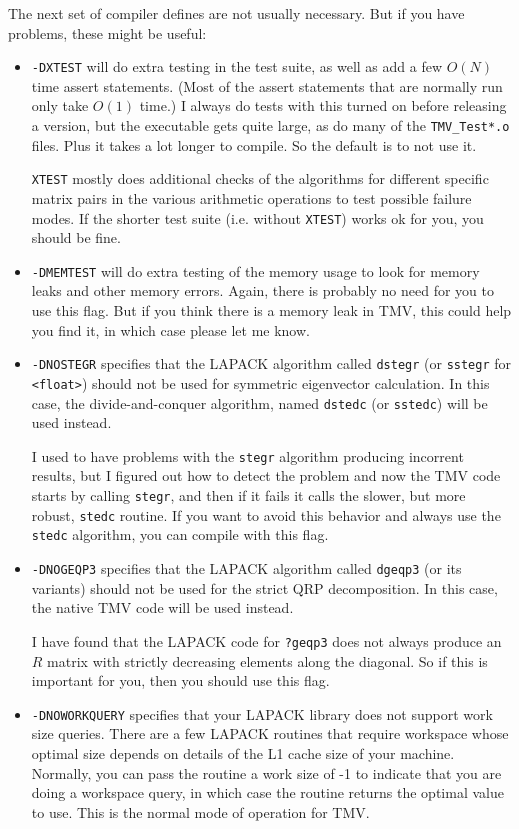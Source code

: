 \documentclass[twoside,letterpaper,11pt]{article}
\renewcommand{\tt}[1]{{\lstinline {#1}}}
\begin{document}
The next set of compiler defines are not usually necessary.  But
if you have problems, these might be useful:
\begin{itemize}
\item
\texttt{-DXTEST} will do extra testing in the test suite, as well as add a few $O(N)$
time assert statements.  (Most of the assert statements that are normally run only take
$O(1)$ time.)  I always do tests with this turned on before releasing a version, but the
executable gets quite large, as do many of the \texttt{TMV\_Test*.o} files.  Plus it takes
a lot longer to compile.  So the default is to not use it.

\texttt{XTEST} mostly does additional checks
of the algorithms for different specific matrix pairs in the various
arithmetic operations to test possible failure modes.  If the shorter test suite
(i.e. without \texttt{XTEST}) works ok for you, you should be fine.

\item
\texttt{-DMEMTEST} will do extra testing of the memory usage to look for memory leaks
and other memory errors.  Again, there is probably no need for you to use this
flag.  But if you think there is a memory leak in TMV, this could help you find it, 
in which case please let me know.

\item
\texttt{-DNOSTEGR} specifies that the LAPACK algorithm called
\tt{dstegr} (or \tt{sstegr} for \tt{<float>}) should not be used for symmetric
eigenvector calculation.  In this case, the divide-and-conquer algorithm,
named \tt{dstedc} (or \tt{sstedc}) will be used instead.

I used to have problems with the \tt{stegr} algorithm producing incorrent
results, but I figured out how to detect the problem and now
the TMV code starts by calling \tt{stegr}, and then if it fails it calls
the slower, but more robust, \tt{stedc} routine.
If you want to avoid this behavior and always use the \tt{stedc} algorithm,
you can compile with this flag.
\item
\texttt{-DNOGEQP3} specifies that the LAPACK algorithm called
\tt{dgeqp3} (or its variants) should not be used for the strict QRP decomposition.
In this case, the native TMV code will be used instead.

I have found that the LAPACK code for \tt{?geqp3} does not always
produce an $R$ matrix
with strictly decreasing elements along the diagonal.  So if this is important
for you, then you should use this flag.
\item
\texttt{-DNOWORKQUERY} specifies that your LAPACK library does not support
work size queries.  There are a few LAPACK routines that require workspace whose
optimal size depends on details of the L1 cache size of your machine.  Normally,
you can pass the routine a work size of -1 to indicate that you are doing a workspace
query, in which case the routine returns the optimal value to use.  This is the normal
mode of operation for TMV.  


\end{itemize}
\end{document}
